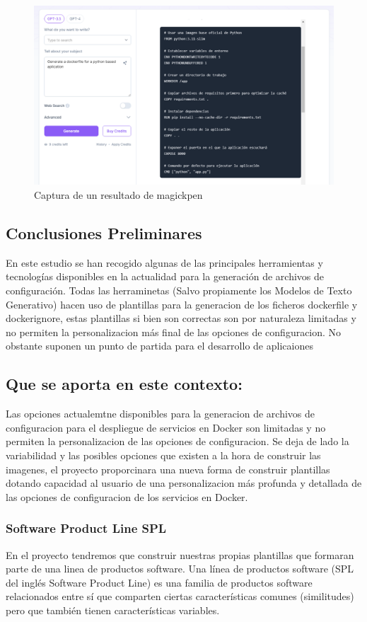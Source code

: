 \documentclass[12pt, a4paper, twoside]{article}
\begin{document}
\begin{figure}[ht]
	\centering
		\includegraphics[width=1\textwidth]{MagickPen.png}
	\caption{Captura de un resultado de magickpen}
\end{figure}


\newpage
\subsection{Conclusiones Preliminares}
En este estudio se han recogido algunas de las principales herramientas y tecnologías disponibles en la actualidad para la generación de archivos de configuración.
Todas las herraminetas (Salvo propiamente los Modelos de Texto Generativo) hacen uso de plantillas para la generacion de los ficheros dockerfile y dockerignore, estas plantillas si bien son correctas son por naturaleza limitadas y no permiten la personalizacion más final de las opciones de configuracion.
No obstante suponen un punto de partida para el desarrollo de aplicaiones 

\subsection{Que se aporta en este contexto:}
Las opciones actualemtne disponibles para la generacion de archivos de configuracion para el despliegue de servicios en Docker son limitadas y no permiten la personalizacion de las opciones de configuracion.
Se deja de lado la variabilidad y las posibles opciones que existen a la hora de construir las imagenes, el proyecto proporcinara una nueva forma de construir plantillas dotando capacidad al usuario de una personalizacion
más profunda y detallada de las opciones de configuracion de los servicios en Docker.
\subsubsection{Software Product Line SPL}
En el proyecto tendremos que construir nuestras propias plantillas que formaran parte de una linea de productos software.
Una línea de productos software (SPL del inglés Software Product Line) es una familia de productos software 
relacionados entre sí que comparten ciertas características comunes (similitudes) pero que también tienen 
características variables.
\end{document}
